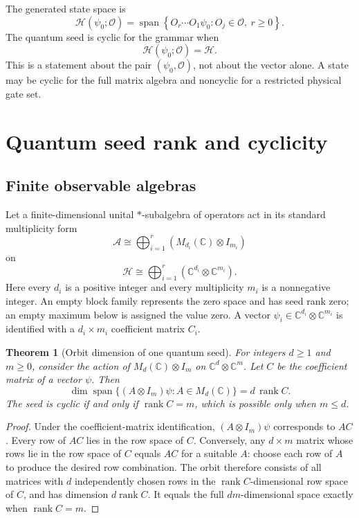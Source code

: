 \documentclass[11pt]{article}
\newtheorem{theorem}{Theorem}[section]
\theoremstyle{definition}
\theoremstyle{remark}
\newcommand{\cA}{\mathcal A}
\newcommand{\cH}{\mathcal H}
\newcommand{\cO}{\mathcal O}
\newcommand{\bbC}{\mathbb C}
\newcommand{\rank}{\operatorname{rank}}
\begin{document}
The generated state space is
\[
\cH(\psi_0;\cO)
=
\operatorname{span}
\left\{
O_r\cdots O_1\psi_0:
O_j\in\cO,
\ r\ge0
\right\}.
\]
The quantum seed is cyclic for the grammar when
\[
\cH(\psi_0;\cO)=\cH.
\]
This is a statement about the pair $(\psi_0,\cO)$, not about the vector alone. A state may be cyclic for the full matrix algebra and noncyclic for a restricted physical gate set.

\section{Quantum seed rank and cyclicity}

\subsection{Finite observable algebras}

Let a finite-dimensional unital $*$-subalgebra of operators act in its standard multiplicity form
\[
\cA
\cong
\bigoplus_{i=1}^r
\left(M_{d_i}(\bbC)\otimes I_{m_i}\right)
\]
on
\[
\cH
\cong
\bigoplus_{i=1}^r
\left(\bbC^{d_i}\otimes\bbC^{m_i}\right).
\]
Here every $d_i$ is a positive integer and every multiplicity $m_i$ is a nonnegative integer. An empty block family represents the zero space and has seed rank zero; an empty maximum below is assigned the value zero. A vector $\psi_i\in\bbC^{d_i}\otimes\bbC^{m_i}$ is identified with a $d_i\times m_i$ coefficient matrix $C_i$.

\begin{theorem}[Orbit dimension of one quantum seed]\label{thm:seed-orbit}
For integers $d\ge1$ and $m\ge0$, consider the action of $M_d(\bbC)\otimes I_m$ on $\bbC^d\otimes\bbC^m$. Let $C$ be the coefficient matrix of a vector $\psi$. Then
\[
\boxed{
\dim\operatorname{span}\{(A\otimes I_m)\psi:A\in M_d(\bbC)\}
=d\,\rank C.
}
\]
The seed is cyclic if and only if $\rank C=m$, which is possible only when $m\le d$.
\end{theorem}

\begin{proof}
Under the coefficient-matrix identification, $(A\otimes I_m)\psi$ corresponds to $AC$. Every row of $AC$ lies in the row space of $C$. Conversely, any $d\times m$ matrix whose rows lie in the row space of $C$ equals $AC$ for a suitable $A$: choose each row of $A$ to produce the desired row combination. The orbit therefore consists of all matrices with $d$ independently chosen rows in the $\rank C$-dimensional row space of $C$, and has dimension $d\rank C$. It equals the full $dm$-dimensional space exactly when $\rank C=m$.
\end{proof}
\end{document}
